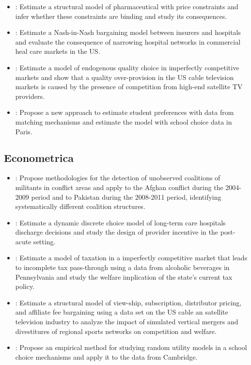 \documentclass[
]{book}
\begin{document}
\begin{itemize}
\item
  \citet{duboisIdentifyingIndustryMargins2018}: Estimate a structural model of pharmaceutical with price constraints and infer whether these constraints are binding and study its consequences.
\item
  \citet{hoEquilibriumProviderNetworks2019}: Estimate a Nash-in-Nash bargaining model between insurers and hospitals and evaluate the consequence of narrowing hospital networks in commercial heal care markets in the US.
\item
  \citet{crawfordQualityOverprovisionCable2019}: Estimate a model of endogenous quality choice in imperfectly competitive markets and show that a quality over-provision in the US cable television markets is caused by the presence of competition from high-end satellite TV providers.
\item
  \citet{fackTruthTellingPreferenceEstimation2019}: Propose a new approach to estimate student preferences with data from matching mechanisms and estimate the model with school choice data in Paris.
\end{itemize}

\hypertarget{econometrica}{%
\subsection{Econometrica}\label{econometrica}}

\begin{itemize}
\item
  \citet{trebbiInsurgencySmallWars2019}: Propose methodologies for the detection of unobserved coalitions of militants in conflict areas and apply to the Afghan conflict during the 2004-2009 period and to Pakistan during the 2008-2011 period, identifying systematically different coalition structures.
\item
  \citet{einavProviderIncentivesHealthcare2018}: Estimate a dynamic discrete choice model of long-term care hospitals discharge decisions and study the design of provider incentive in the post-acute setting.
\item
  \citet{miraveteMarketPowerLaffer2018}: Estimate a model of taxation in a imperfectly competitive market that leads to incomplete tax pass-through using a data from alcoholic beverages in Pennsylvania and study the welfare implication of the state's current tax policy.
\item
  \citet{crawfordWelfareEffectsVertical2018}: Estimate a structural model of view-ship, subscription, distributor pricing, and affiliate fee bargaining using a data set on the US cable an satellite television industry to analyze the impact of simulated vertical mergers and divestitures of regional sports networks on competition and welfare.
\item
  \citet{agarwalDemandAnalysisUsing2018}: Propose an empirical method for studying random utility models in a school choice mechanisms and apply it to the data from Cambridge.
\end{itemize}
\end{document}
